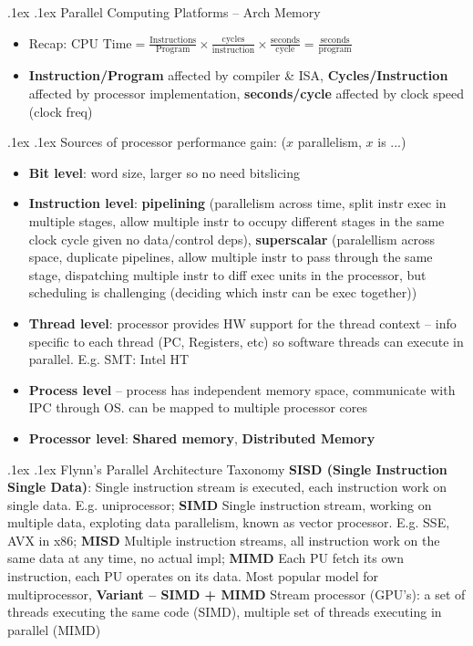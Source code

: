 \documentclass[10pt,landscape,a4paper]{article}
\makeatletter
\renewcommand{\section}{\@startsection{section}{1}{0mm}%
  {.1ex}%
  {.1ex}%
{\color{myblue}\sffamily\scriptsize\bfseries}}
\renewcommand{\subsection}{\@startsection{subsection}{1}{0mm}%
  {.1ex}%
  {.1ex}%
{\sffamily\bfseries}}
\makeatother
\begin{document}
\begin{multicols*}{4}
  \section{Parallel Computing Platforms -- Arch Memory}
  \begin{itemize}
    \item Recap: $\text{CPU Time} = \frac{\text{Instructions}}{\text{Program}}\times\frac{\text{cycles}}{\text{instruction}}\times\frac{\text{seconds}}{\text{cycle}} = \frac{\text{seconds}}{\text{program}}$
    \item \textbf{Instruction/Program} affected by compiler \& ISA, \textbf{Cycles/Instruction} affected by processor implementation, \textbf{seconds/cycle} affected by clock speed (clock freq)
  \end{itemize}
   \subsection{Sources of processor performance gain: ($x$ parallelism, $x$ is ...)}
    \begin{itemize}
      \item \textbf{Bit level}: word size, larger so no need bitslicing
      \item \textbf{Instruction level}: \textbf{pipelining} (parallelism across time, split instr exec in multiple stages, allow multiple instr to occupy different stages in the same clock cycle given no data/control deps), \textbf{superscalar} (paralellism across space, duplicate pipelines, allow multiple instr to pass through the same stage, dispatching multiple instr to diff exec units in the processor, but scheduling is challenging (deciding which instr can be exec together))
      \item \textbf{Thread level}: processor provides HW support for the thread context -- info specific to each thread (PC, Registers, etc) so software threads can execute in parallel. E.g. SMT: Intel HT
      \item \textbf{Process level} -- process has independent memory space, communicate with IPC through OS. can be mapped to multiple processor cores
      \item \textbf{Processor level}: \textbf{Shared memory}, \textbf{Distributed Memory}
    \end{itemize}
  \subsection{Flynn's Parallel Architecture Taxonomy}
  \textbf{SISD (Single Instruction Single Data)}: Single instruction stream is executed, each instruction work on single data. E.g. uniprocessor; \textbf{SIMD}
  Single instruction stream, working on multiple data, exploting data parallelism, known as vector processor. E.g. SSE, AVX in x86; \textbf{MISD}
  Multiple instruction streams, all instruction work on the same data at any time, no actual impl; \textbf{MIMD} Each PU fetch its own instruction, each PU operates on its data. Most popular model for multiprocessor, \textbf{Variant -- SIMD + MIMD}
  Stream processor (GPU's): a set of threads executing the same code (SIMD), multiple set of threads executing in parallel (MIMD)

\end{multicols*}
\end{document}

